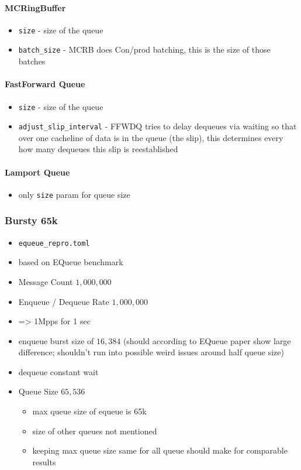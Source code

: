 \paragraph{MCRingBuffer}
\begin{itemize}
    \item \texttt{size} - size of the queue
    \item \texttt{batch\_size} - MCRB does Con/prod batching, this is the size of those batches
\end{itemize}

\paragraph{FastForward Queue}
\begin{itemize}
    \item \texttt{size} - size of the queue
    \item \texttt{adjust\_slip\_interval} - FFWDQ tries to delay dequeues via waiting so that over one
        cacheline of data is in the queue (the slip), this determines every how many dequeues this slip is
        reestablished 
\end{itemize}

\paragraph{Lamport Queue}
\begin{itemize}
    \item only \texttt{size} param for queue size
\end{itemize}

\subsubsection{Bursty 65k}
\begin{itemize}
    \item \texttt{equeue\_repro.toml}
    \item based on EQueue benchmark
    \item Message Count $1,000,000$
    \item Enqueue / Dequeue Rate $1,000,000$ 
    \item => 1Mpps for 1 sec
    \item enqueue burst size of $16,384$ (should according to EQueue paper show large difference; shouldn't
        run into possible weird issues around half queue size)
    \item dequeue constant wait
    \item Queue Size $65,536$
        \begin{itemize}
            \item max queue size of equeue is 65k
            \item size of other queues not mentioned
            \item keeping max queue size same for all queue should make for comparable results
        \end{itemize}
\end{itemize}


